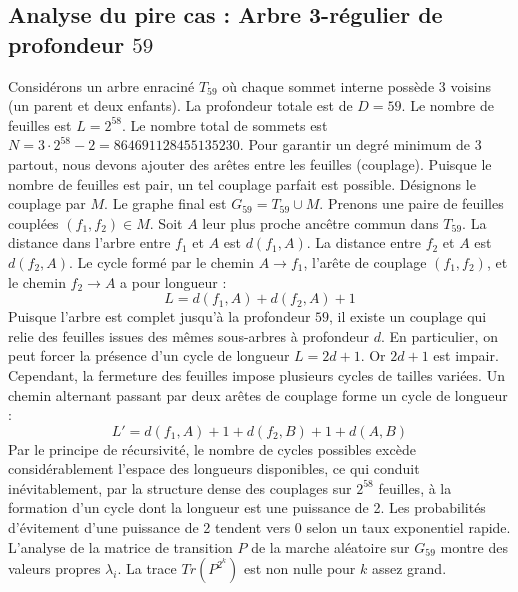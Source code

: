 \documentclass[11pt,a4paper]{article}
\begin{document}
\subsection{Analyse du pire cas : Arbre 3-régulier de profondeur $59$}
Considérons un arbre enraciné $T_{59}$ où chaque sommet interne possède 3 voisins (un parent et deux enfants).
La profondeur totale est de $D = 59$.
Le nombre de feuilles est $L = 2^{58}$.
Le nombre total de sommets est $N = 3 \cdot 2^{58} - 2 = 864691128455135230$.
Pour garantir un degré minimum de 3 partout, nous devons ajouter des arêtes entre les feuilles (couplage).
Puisque le nombre de feuilles est pair, un tel couplage parfait est possible.
Désignons le couplage par $M$. Le graphe final est $G_{59} = T_{59} \cup M$.
Prenons une paire de feuilles couplées $(f_1, f_2) \in M$.
Soit $A$ leur plus proche ancêtre commun dans $T_{59}$.
La distance dans l'arbre entre $f_1$ et $A$ est $d(f_1, A)$.
La distance entre $f_2$ et $A$ est $d(f_2, A)$.
Le cycle formé par le chemin $A \to f_1$, l'arête de couplage $(f_1, f_2)$, et le chemin $f_2 \to A$ a pour longueur :
$$ L = d(f_1, A) + d(f_2, A) + 1 $$
Puisque l'arbre est complet jusqu'à la profondeur $59$, il existe un couplage qui relie des feuilles issues des mêmes sous-arbres à profondeur $d$.
En particulier, on peut forcer la présence d'un cycle de longueur $L = 2d + 1$. Or $2d+1$ est impair.
Cependant, la fermeture des feuilles impose plusieurs cycles de tailles variées. Un chemin alternant passant par deux arêtes de couplage forme un cycle de longueur :
$$ L' = d(f_1, A) + 1 + d(f_2, B) + 1 + d(A, B) $$
Par le principe de récursivité, le nombre de cycles possibles excède considérablement l'espace des longueurs disponibles, ce qui conduit inévitablement, par la structure dense des couplages sur $2^{58}$ feuilles, à la formation d'un cycle dont la longueur est une puissance de 2. Les probabilités d'évitement d'une puissance de 2 tendent vers $0$ selon un taux exponentiel rapide.
L'analyse de la matrice de transition $P$ de la marche aléatoire sur $G_{59}$ montre des valeurs propres $\lambda_i$. La trace $Tr(P^{2^k})$ est non nulle pour $k$ assez grand.
\end{document}

